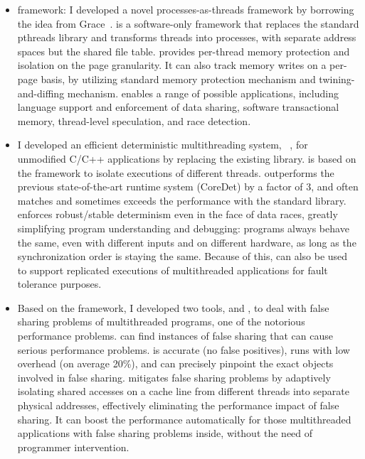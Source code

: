 \begin{itemize}
\item \Sheriff{} framework: I developed a novel processes-as-threads framework by borrowing the idea from Grace~\cite{grace}. \sheriff{} is a software-only framework that replaces the standard pthreads library and transforms
threads into processes, with separate address spaces but the shared file table. \sheriff{} provides per-thread memory protection and isolation on the page granularity. It can also track memory writes on a per-page basis, by utilizing standard memory protection mechanism and  twining-and-diffing mechanism. \sheriff{} enables a range of possible applications, including language support and enforcement of data sharing, software transactional memory, thread-level speculation, and race detection. 

\item I developed an efficient deterministic multithreading system, \dthreads{}~\cite{dthreads}, for unmodified C/C++ applications by replacing the existing \pthreads{} library. \dthreads{} is based on the \sheriff{} framework to isolate executions of different threads. \dthreads{} outperforms the previous state-of-the-art runtime system (CoreDet) by a factor of 3, and often matches and sometimes exceeds the performance with the standard \pthreads{} library. \Dthreads{} enforces robust/stable determinism even in the face of data races, greatly simplifying program understanding and debugging: programs always behave the same, even with different inputs and on different hardware, as long as the synchronization order is staying the same. Because of this, \dthreads{} can also be used to support replicated executions of multithreaded applications for fault tolerance purposes.

\item 
Based on the \sheriff{} framework, I developed two tools, \SheriffDetect{} and \SheriffProtect{}, to deal with false sharing problems of multithreaded programs, one of the notorious performance problems. 
\SheriffDetect{} can find instances of false sharing that can cause serious performance problems. \SheriffDetect{} is accurate (no false positives), runs with low overhead (on average 20\%), and can precisely pinpoint the exact objects involved in false sharing.
\SheriffProtect{} mitigates false sharing problems by adaptively isolating shared accesses on a cache line from different threads into separate physical addresses, effectively eliminating the performance impact of false sharing. It can boost the performance automatically for those multithreaded applications with false sharing problems inside, without the need of programmer intervention. 


\end{itemize}
